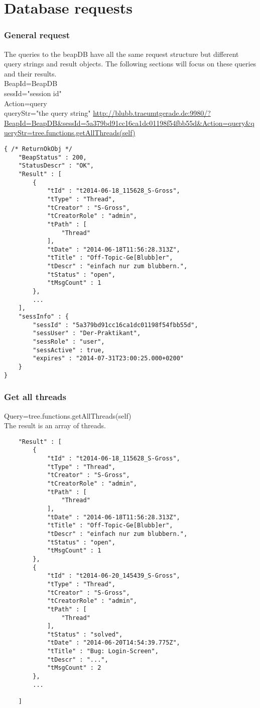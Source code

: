 \documentclass[12pt,a4paper,oneside]{report}
\begin{document}
\section{Database requests}
\subsubsection{General request}
The queries to the beapDB have all the same request structure but different query strings and result objects. The following sections will focus on these queries and their results.
\\
BeapId=BeapDB\\
sessId="session id"\\
Action=query\\
queryStr="the query string"
\url{http://blubb.traeumtgerade.de:9980/?BeapId=BeapDB&sessId=5a379bd91cc16ca1dc01198f54fbb55d&Action=query&queryStr=tree.functions.getAllThreads(self)}

\begin{lstlisting}
{ /* ReturnOkObj */
    "BeapStatus" : 200,
    "StatusDescr" : "OK",
    "Result" : [  
        { 
            "tId" : "t2014-06-18_115628_S-Gross",
            "tType" : "Thread",
            "tCreator" : "S-Gross",
            "tCreatorRole" : "admin",
            "tPath" : [  
                "Thread"
            ],
            "tDate" : "2014-06-18T11:56:28.313Z",
            "tTitle" : "Off-Topic-Ge[Blubb]er",
            "tDescr" : "einfach nur zum blubbern.",
            "tStatus" : "open",
            "tMsgCount" : 1
        },
        ...
    ],
    "sessInfo" : { 
        "sessId" : "5a379bd91cc16ca1dc01198f54fbb55d",
        "sessUser" : "Der-Praktikant",
        "sessRole" : "user",
        "sessActive" : true,
        "expires" : "2014-07-31T23:00:25.000+0200"
    }
}
\end{lstlisting}

\subsubsection{Get all threads}
Query=tree.functions.getAllThreads(self)\\
The result is an array of threads.
\begin{lstlisting}
    "Result" : [  
        { 
            "tId" : "t2014-06-18_115628_S-Gross",
            "tType" : "Thread",
            "tCreator" : "S-Gross",
            "tCreatorRole" : "admin",
            "tPath" : [  
                "Thread"
            ],
            "tDate" : "2014-06-18T11:56:28.313Z",
            "tTitle" : "Off-Topic-Ge[Blubb]er",
            "tDescr" : "einfach nur zum blubbern.",
            "tStatus" : "open",
            "tMsgCount" : 1
        },
        { 
            "tId" : "t2014-06-20_145439_S-Gross",
            "tType" : "Thread",
            "tCreator" : "S-Gross",
            "tCreatorRole" : "admin",
            "tPath" : [  
                "Thread"
            ],
            "tStatus" : "solved",
            "tDate" : "2014-06-20T14:54:39.775Z",
            "tTitle" : "Bug: Login-Screen",
            "tDescr" : "...",
            "tMsgCount" : 2
        },
        ...
        
    ]
\end{lstlisting}
\clearpage
\end{document}
